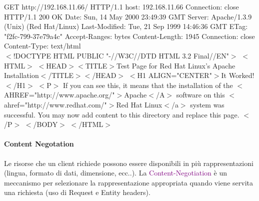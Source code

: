 \begin{mdframed}
    GET http://192.168.11.66/ HTTP/1.1\newline
    host: 192.168.11.66\newline
    Connection: close\newline
    \\
    HTTP/1.1 200 OK\newline
    Date: Sun, 14 May 2000 23:49:39 GMT\newline
    Server: Apache/1.3.9 (Unix) (Red Hat/Linux)\newline
    Last-Modified: Tue, 21 Sep 1999 14:46:36 GMT\newline
    ETag: "f2fc-799-37e79a4c"\newline
    Accept-Ranges: bytes\newline
    Content-Length: 1945\newline
    Connection: close\newline
    Content-Type: text/html\newline
    \\
    $<$!DOCTYPE HTML PUBLIC "-//W3C//DTD HTML 3.2 Final//EN"$>$\newline
    $<$HTML$>$\newline
    $<$HEAD$>$$<$TITLE$>$Test Page for Red Hat Linux's Apache Installation$<$/TITLE$>$$<$/HEAD$>$\newline
    $<$H1 ALIGN="CENTER"$>$It Worked!$<$/H1$>$\newline
    $<$P$>$\newline
    If you can see this, it means that the installation of the $<$AHREF="http://www.apache.org/"$>$Apache$<$/A$>$ software on this $<$ahref="http://www.redhat.com/"$>$Red Hat Linux$<$/a$>$ system was successful. You may now add content to this directory and replace this page.\newline
    $<$/P$>$\newline
    $<$/BODY$>$\newline
    $<$/HTML$>$\newline    
\end{mdframed}

\paragraph{Content Negotation}
Le risorse che un client richiede possono essere disponibili in più rappresentazioni (lingua, formato di dati, dimensione, ecc..). La \textcolor{purple}{Content-Negotiation} è un meccanismo per selezionare la rappresentazione appropriata quando viene servita una richiesta (uso di Request e Entity headers).

